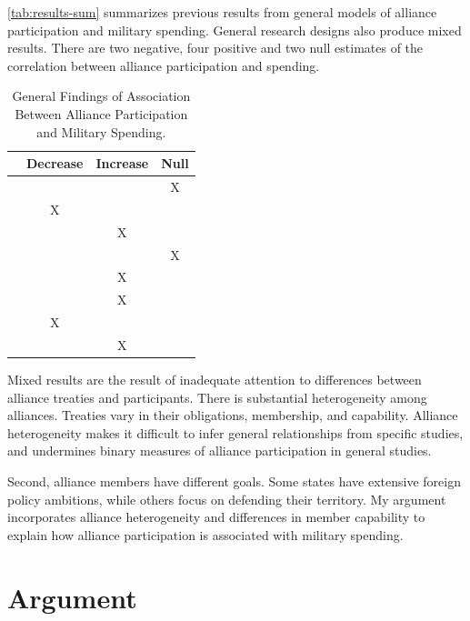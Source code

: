 \documentclass[12pt]{article}
\begin{document}
\autoref{tab:results-sum} summarizes previous results from general models of alliance participation and military spending. 
General research designs also produce mixed results. 
There are two negative, four positive and two null estimates of the correlation between alliance participation and spending. 


\begin{table}[hbt!]
\begin{center}
\begin{tabular}{lccc}
     & Decrease & Increase & Null \\
\hline
\citet{MostSiverson1987} &  &  & X \\
\citet{Conybeare1994} & X & &  \\
\citet{Diehl1994} &  & X &  \\
\citet{Goldsmith2003} &  &  & X \\
\citet{MorganPalmer2006} &  & X & \\ 
\citet{QuirozFlores2011} &  & X &  \\ 
\citet{DigiuseppePoast2016} & X &  & \\ 
\citet{Horowitzetal2017} &  & X & \\ 
\hline
\end{tabular}
\caption{General Findings of Association Between Alliance Participation and Military Spending.}
\label{tab:results-sum}
\end{center} 
\end{table}


Mixed results are the result of inadequate attention to differences between alliance treaties and participants.
There is substantial heterogeneity among alliances.
Treaties vary in their obligations, membership, and capability. 
Alliance heterogeneity makes it difficult to infer general relationships from specific studies, and undermines binary measures of alliance participation in general studies. 
 

Second, alliance members have different goals.
Some states have extensive foreign policy ambitions, while others focus on defending their territory. 
My argument incorporates alliance heterogeneity and differences in member capability to explain how alliance participation is associated with military spending. 



\section{Argument}
\end{document}
